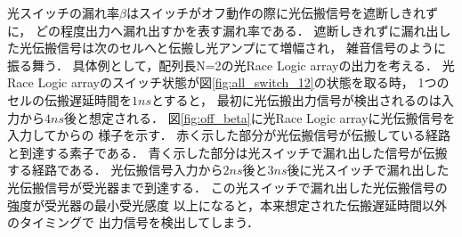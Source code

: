 光スイッチの漏れ率$\beta$はスイッチがオフ動作の際に光伝搬信号を遮断しきれずに，
どの程度出力へ漏れ出すかを表す漏れ率である．
遮断しきれずに漏れ出した光伝搬信号は次のセルへと伝搬し光アンプにて増幅され，
雑音信号のように振る舞う．
具体例として，配列長N=2の光Race Logic arrayの出力を考える．
光Race Logic arrayのスイッチ状態が図\ref{fig:all_switch_12}の状態を取る時，
1つのセルの伝搬遅延時間を$1ns$とすると，
最初に光伝搬出力信号が検出されるのは入力から$4ns$後と想定される．
図\ref{fig:off_beta}に光Race Logic arrayに光伝搬信号を入力してからの
様子を示す．
赤く示した部分が光伝搬信号が伝搬している経路と到達する素子である．
青く示した部分は光スイッチで漏れ出した信号が伝搬する経路である．
光伝搬信号入力から$2ns$後と$3ns$後に光スイッチで漏れ出した
光伝搬信号が受光器まで到達する．
この光スイッチで漏れ出した光伝搬信号の強度が受光器の最小受光感度
以上になると，本来想定された伝搬遅延時間以外のタイミングで
出力信号を検出してしまう．
